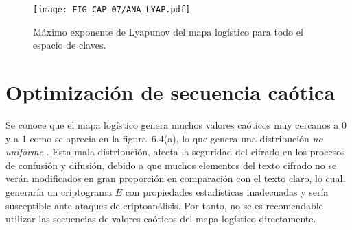\begin{table}[!htbp] %
	\center
	\caption{Clave secreta propuesta.}
\end{table}

\begin{figure}[!htbp] %
	\texttt{[image: FIG\_CAP\_07/ANA\_LYAP.pdf]}    
	\caption{Máximo exponente de Lyapunov del mapa logístico para todo el espacio de claves.}
\end{figure}

\section{Optimización de secuencia caótica}
Se conoce que el mapa logístico genera muchos valores caóticos muy cercanos a 0 y a 1 como se aprecia en la figura~6.4(a), lo que genera una distribución \textit{no uniforme} \cite{AEtAl_2008}. Esta mala distribución, afecta la seguridad del cifrado en los procesos de confusión y difusión, debido a que muchos elementos del texto cifrado no se verán modificados en gran proporción en comparación con el texto claro, lo cual, generaría un criptograma $E$ con propiedades estadísticas inadecuadas y sería susceptible ante ataques de criptoanálisis. Por tanto, no se es recomendable utilizar las secuencias de valores caóticos del mapa logístico directamente. \\

